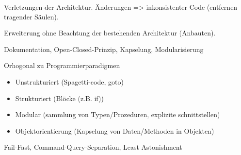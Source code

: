 Verletzungen der Architektur. Änderungen => inkonsistenter Code (entfernen tragender Säulen).

Erweiterung ohne Beachtung der bestehenden Architektur (Anbauten).

 Dokumentation, Open-Closed-Prinzip, Kapselung, Modularisierung

Orhogonal zu Programmierparadigmen
\begin{itemize}
\item Unstrukturiert (Spagetti-code, goto)
\item Strukturiert (Blöcke (z.B. if))
\item Modular (sammlung von Typen/Prozeduren, explizite schnittstellen)
\item Objektorientierung (Kapselung von Daten/Methoden in Objekten)
\end{itemize}

Fail-Fast, Command-Query-Separation, Least Astonishment


